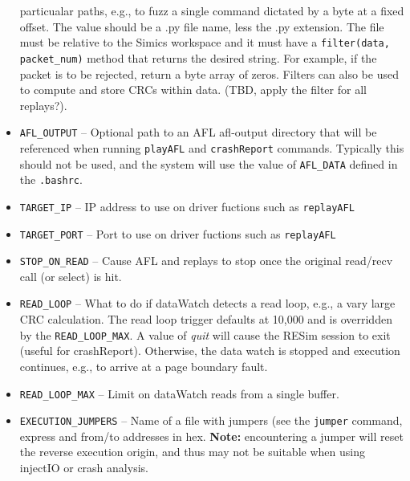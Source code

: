 \documentclass[titlepage]{article}
\begin{document}
\begin{itemize}
particualar paths, e.g., to fuzz a single command dictated by a byte at a fixed offset.  The value should be a .py file name, less the
.py extension.  The file must be relative to the Simics workspace and it must have a {\tt filter(data, packet\_num)} method that returns
the desired string.  For example, if the packet is to be rejected, return a byte array of zeros.  Filters can also be used to 
compute and store CRCs within data.  (TBD, apply the filter for all replays?).
\item {\tt AFL\_OUTPUT} -- Optional path to an AFL afl-output directory that will be referenced when running {\tt playAFL} and {\tt crashReport} commands. Typically this should not be used, and the system will use the value of {\tt AFL\_DATA} defined in the {\tt .bashrc}.
\item {\tt TARGET\_IP} -- IP address to use on driver fuctions such as {\tt replayAFL}
\item {\tt TARGET\_PORT} -- Port to use on driver fuctions such as {\tt replayAFL}
\item {\tt STOP\_ON\_READ} -- Cause AFL and replays to stop once the original read/recv call (or select) is hit.
\item {\tt READ\_LOOP} -- What to do if dataWatch detects a read loop, e.g., a vary large CRC calculation.  The read loop trigger defaults at 10,000
and is overridden by the {\tt READ\_LOOP\_MAX}.  A value of \textit{quit} will cause
the RESim session to exit (useful for crashReport).  Otherwise, the data watch is stopped and execution continues, e.g., to arrive at a page boundary fault.
\item {\tt READ\_LOOP\_MAX} -- Limit on dataWatch reads from a single buffer.
\item {\tt EXECUTION\_JUMPERS} -- Name of a file with jumpers (see the {\tt jumper} command, express and from/to addresses in hex.  \textbf{Note:} encountering
a jumper will reset the reverse execution origin, and thus may not be suitable when using injectIO or crash analysis.

\end{itemize}
\end{document}
